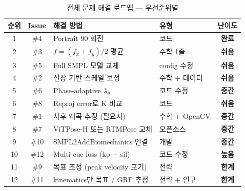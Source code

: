 \documentclass[11pt, a4paper]{report}
\begin{document}
\begin{table}[H]
\centering
\caption{전체 문제 해결 로드맵 --- 우선순위별}
\renewcommand{\arraystretch}{1.5}
\small
\begin{tabular}{c c p{5cm} p{3cm} c}
\toprule
\textbf{순위} & \textbf{Issue} & \textbf{해결 방법} & \textbf{유형} & \textbf{난이도} \\
\midrule
\rowcolor{solvable!10}
1 & \#4 & Portrait 90\textdegree{} 회전 & 코드 & {\color{solvable}\textbf{완료}} \\
\rowcolor{solvable!10}
2 & \#3 & $f = (f_x+f_y)/2$ 평균 & 수학 1줄 & {\color{solvable}\textbf{쉬움}} \\
\rowcolor{solvable!10}
3 & \#5 & Full SMPL 모델 교체 & config 수정 & {\color{solvable}\textbf{쉬움}} \\
\rowcolor{solvable!10}
4 & \#2 & 신장 기반 스케일 보정 & 수학 + 데이터 & {\color{solvable}\textbf{쉬움}} \\
\rowcolor{solvable!10}
5 & \#6 & Phase-adaptive $\lambda_\theta$ & 코드 수정 & {\color{solvable}\textbf{중간}} \\
\rowcolor{solvable!10}
6 & \#8 & Reproj error로 K 비교 & 코드 & {\color{solvable}\textbf{쉬움}} \\
\rowcolor{solvable!10}
7 & \#1 & 사후 왜곡 추정 (필요시) & 수학 + OpenCV & {\color{solvable}\textbf{중간}} \\
\midrule
\rowcolor{partial!10}
8 & \#7 & ViTPose-H 또는 RTMPose 교체 & 오픈소스 & {\color{partial}\textbf{중간}} \\
\rowcolor{partial!10}
9 & \#10 & SMPL2AddBiomechanics 연결 & 개발 & {\color{partial}\textbf{중간}} \\
\rowcolor{partial!10}
10 & \#12 & Multi-cue loss (kp + sil) & 코드 수정 & {\color{partial}\textbf{높음}} \\
\midrule
\rowcolor{hard!10}
11 & \#9 & 목표 조정 (peak velocity 포기) & 전략 & {\color{hard}\textbf{한계}} \\
\rowcolor{hard!10}
12 & \#11 & kinematics만 목표 / GRF 추정 & 전략 + 연구 & {\color{hard}\textbf{한계}} \\
\bottomrule
\end{tabular}
\end{table}
\end{document}
